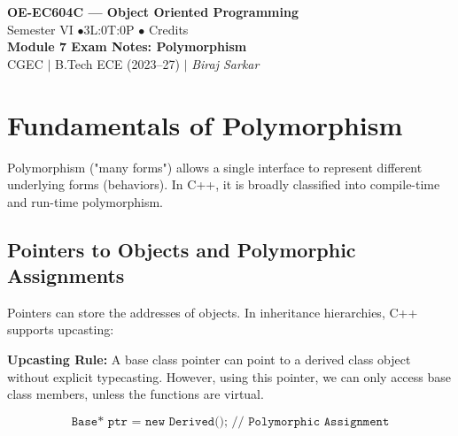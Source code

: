 \documentclass[12pt,a4paper]{article}
\begin{document}

\begin{center}
  {\LARGE\bfseries\color{myred} OE-EC604C --- Object Oriented Programming}\\[5pt]
  {\normalsize\color{mydark} Semester VI \quad$\bullet$\quad 3L:0T:0P \quad$\bullet$ Credits}\\[3pt]
  {\normalsize\color{myteal}\textbf{Module 7 Exam Notes: Polymorphism}}\\[3pt]
  {\small\color{mydark} CGEC \;$|$\; B.Tech ECE (2023--27) \;$|$\; \textit{Biraj Sarkar}}
\end{center}
\vspace{2pt}
\noindent{\color{myred}\rule{\linewidth}{1.5pt}}
\vspace{2pt}

\hypersetup{linkcolor=mydark}
\tableofcontents
\hypersetup{linkcolor=myteal}
\newpage

\section{Fundamentals of Polymorphism}

Polymorphism ("many forms") allows a single interface to represent different underlying forms (behaviors). In C++, it is broadly classified into compile-time and run-time polymorphism.

\subsection{Pointers to Objects and Polymorphic Assignments}
Pointers can store the addresses of objects. In inheritance hierarchies, C++ supports upcasting:
\begin{tcolorbox}[defbox]
\textbf{Upcasting Rule:} A base class pointer can point to a derived class object without explicit typecasting. However, using this pointer, we can only access base class members, unless the functions are virtual.
\end{tcolorbox}
\begin{equation}
  \texttt{Base* ptr = new Derived(); // Polymorphic Assignment}
\end{equation}
\end{document}
